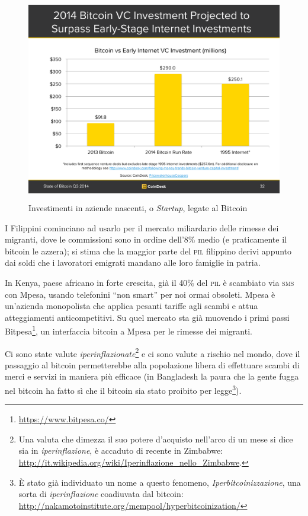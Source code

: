 \documentclass[a4paper,12pt,italian]{article}
\begin{document}
\begin{figure}
\centering
\includegraphics[width=15.649cm,height=8.954cm]{figures/vc.pdf}
\caption{Investimenti in aziende nascenti, o \emph{Startup}, legate al Bitcoin}
\end{figure}

\bigskip

I Filippini cominciano ad usarlo per il mercato miliardario delle
rimesse dei migranti, dove le commissioni sono in ordine dell’8\% medio
(e praticamente il bitcoin le azzera); si stima che la maggior parte
del \textsc{pil} filippino derivi appunto dai soldi che i lavoratori emigrati
mandano alle loro famiglie in patria.

\bigskip

In Kenya, paese africano in forte crescita, già il 40\% del \textsc{pil} è
scambiato via \textsc{sms} con Mpesa, usando telefonini “non smart” per noi
ormai obsoleti. Mpesa è un’azienda monopolista che applica pesanti
tariffe agli scambi e attua atteggiamenti anticompetitivi. Su quel
mercato sta già muovendo i primi passi
Bitpesa\footnote{\url{https://www.bitpesa.co/}}, un interfaccia bitcoin a
Mpesa per le rimesse dei migranti.


\bigskip

Ci sono state valute \emph{iperinflazionate}\footnote{Una valuta che dimezza
il suo potere d'acquisto nell'arco di un mese si dice sia in \emph{iperinflazione}, è
accaduto di recente in Zimbabwe: \url{http://it.wikipedia.org/wiki/Iperinflazione_nello_Zimbabwe}.}
e ci sono valute a rischio nel mondo, dove il passaggio al bitcoin
permetterebbe alla popolazione libera di effettuare scambi di merci e
servizi in maniera più efficace (in Bangladesh la paura che la gente
fugga nel bitcoin ha fatto sì che il bitcoin sia stato proibito per
legge\footnote{È stato già individuato un nome a questo fenomeno, \emph{Iperbitcoinizzazione}, una sorta di \emph{iperinflazione}
coadiuvata dal bitcoin: \url{http://nakamotoinstitute.org/mempool/hyperbitcoinization/}}).
\end{document}
